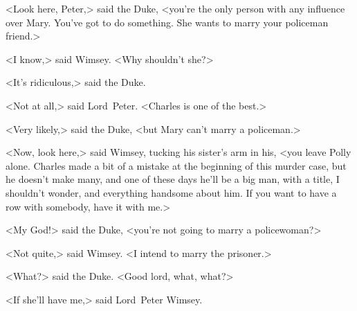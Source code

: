 <Look here, Peter,> said the Duke, <you're the only person with any influence over Mary. You've got to do something. She wants to marry your policeman friend.>

<I know,> said Wimsey. <Why shouldn't she?>

<It's ridiculous,> said the Duke.

<Not at all,> said Lord~Peter. <Charles is one of the best.>

<Very likely,> said the Duke, <but Mary can't marry a policeman.>

<Now, look here,> said Wimsey, tucking his sister's arm in his, <you leave Polly alone. Charles made a bit of a mistake at the beginning of this murder case, but he doesn't make many, and one of these days he'll be a big man, with a title, I shouldn't wonder, and everything handsome about him. If you want to have a row with somebody, have it with me.>

<My God!> said the Duke, <you're not going to marry a policewoman?>

<Not quite,> said Wimsey. <I intend to marry the prisoner.>

<What?> said the Duke. <Good lord, what, what?>

<If she'll have me,> said Lord~Peter Wimsey.